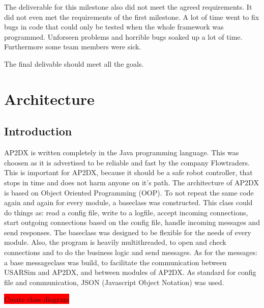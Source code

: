 \documentclass[titlepage, a4paper,10pt]{article}
\newcommand{\todo}[1]{\colorbox{red}{\color{white}#1}}
\begin{document}
The deliverable for this milestone also did not meet the agreed requirements. It
did not even met the requirements of the first milestone. A lot of time went to
fix bugs in code that could only be tested when the whole framework was programmed.
Unforseen problems and horrible bugs soaked up a lot of time. Furthermore some
team members were sick.  

The final delivable should meet all the goals. 

\newpage

\section{Architecture}
\subsection{Introduction}
AP2DX is written completely in the Java programming language. 
This was choosen as it is advertised to be reliable and fast by the company Flowtraders. This is important for AP2DX, because it should be a safe robot controller, that stops in time and does not harm anyone on it's path. The architecture of AP2DX is based on Object Oriented Programming (OOP). 
To not repeat the same code again and again for every module, a baseclass was constructed. 
This class could do things as: read a config file, write to a logfile, accept incoming connections, start outgoing connections based on the config file, handle incoming messages and send responses. 
The baseclass was designed to be flexible for the needs of every module. Also, the program is heavily multithreaded, to open and check connections and to do the business logic and send messages. As for the messages: a base messageclass was build, to facilitate the communication between USARSim and AP2DX, and between modules of AP2DX. As standard for config file and communication, JSON (Javascript Object Notation) was used. 

\todo{Create class diagram}
\end{document}
